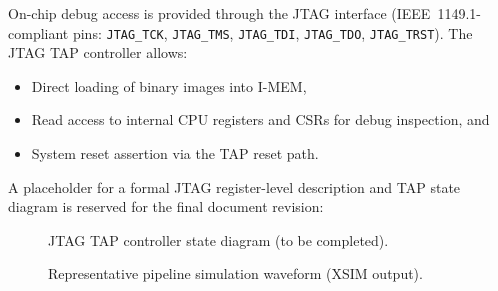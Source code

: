 On-chip debug access is provided through the JTAG interface (IEEE~1149.1-compliant
pins: \texttt{JTAG\_TCK}, \texttt{JTAG\_TMS}, \texttt{JTAG\_TDI}, \texttt{JTAG\_TDO},
\texttt{JTAG\_TRST}).  The JTAG TAP controller allows:

\begin{itemize}
  \item Direct loading of binary images into I-MEM,
  \item Read access to internal CPU registers and CSRs for debug inspection, and
  \item System reset assertion via the TAP reset path.
\end{itemize}

A placeholder for a formal JTAG register-level description and TAP state diagram
is reserved for the final document revision:

\begin{figure}[h]
\centering
\caption{JTAG TAP controller state diagram (to be completed).}
\label{fig:jtag_tap}
\end{figure}

\begin{figure}[h]
\centering
\caption{Representative pipeline simulation waveform (XSIM output).}
\label{fig:pipeline_wave}
\end{figure}


